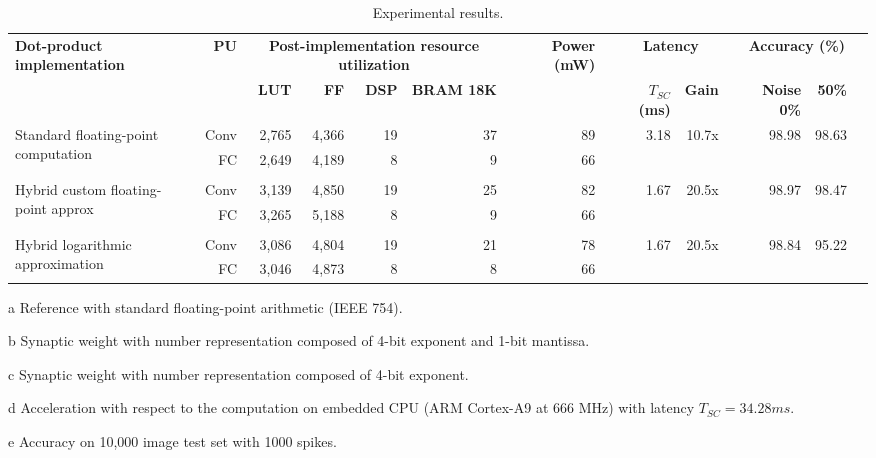 \begin{table}[!t]
	\begin{threeparttable}
		\centering
		\caption{Experimental results.}\label{tab:results}
		\scriptsize
		\begin{tabular}{lrrrrrrrrrrrrrr}\toprule
			\multirow{2}{*}{\textbf{Dot-product implementation}} &\multirow{2}{*}{\textbf{PU}} &\multicolumn{4}{c}{\textbf{Post-implementation resource utilization}} & &\multirow{2}{*}{\textbf{Power (mW)}} & &\multicolumn{2}{c}{\textbf{Latency}} & &\multicolumn{2}{c}{\textbf{Accuracy (\%)\tnote{e}}} \\\cmidrule{3-6}\cmidrule{10-11}\cmidrule{13-14}
			& &\textbf{LUT} &\textbf{FF} &\textbf{DSP} &\textbf{BRAM 18K} & & & &$T_{SC}$ \textbf{(ms)} &\textbf{Gain\tnote{d}} & &\textbf{Noise 0\%} &\textbf{50\%} \\\midrule
			\multirow{2}{*}{Standard floating-point computation\tnote{a}} &Conv &2,765 &4,366 &19 &37 & &89 & &\multirow{2}{*}{3.18} &\multirow{2}{*}{10.7x} & &\multirow{2}{*}{98.98} &\multirow{2}{*}{98.63} \\
			&FC &2,649 &4,189 &8 &9 & &66 & & & & & & \\
			& & & & & & & & & & & & & \\
			\multirow{2}{*}{Hybrid custom floating-point approx\tnote{b}} &Conv &3,139 &4,850 &19 &25 & &82 & &\multirow{2}{*}{1.67} &\multirow{2}{*}{20.5x} & &\multirow{2}{*}{98.97} &\multirow{2}{*}{98.47} \\
			&FC &3,265 &5,188 &8 &9 & &66 & & & & & & \\
			& & & & & & & & & & & & & \\
			\multirow{2}{*}{Hybrid logarithmic approximation\tnote{c}} &Conv &3,086 &4,804 &19 &21 & &78 & &\multirow{2}{*}{1.67} &\multirow{2}{*}{20.5x} & &\multirow{2}{*}{98.84} &\multirow{2}{*}{95.22} \\
			&FC &3,046 &4,873 &8 &8 & &66 & & & & & & \\
			\bottomrule
		\end{tabular}
		\begin{tablenotes}
			\scriptsize
			\item[a] Reference with standard floating-point arithmetic (IEEE 754).
			\item[b] Synaptic weight with number representation composed of 4-bit exponent and 1-bit mantissa.
			\item[c] Synaptic weight with number representation composed of 4-bit exponent.
			\item[d] Acceleration with respect to the computation on embedded CPU (ARM Cortex-A9 at 666 MHz) with latency $T_{SC} = 34.28 ms$.
			\item[e] Accuracy on 10,000 image test set with 1000 spikes.
		\end{tablenotes}
	\end{threeparttable}
\end{table}

